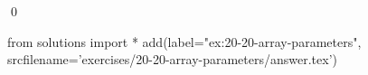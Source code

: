
\begin{ex}
  \label{ex:20-20-array-parameters}
  
  \qed
\end{ex}
\begin{python0}
from solutions import *
add(label="ex:20-20-array-parameters",
    srcfilename='exercises/20-20-array-parameters/answer.tex')
\end{python0}
